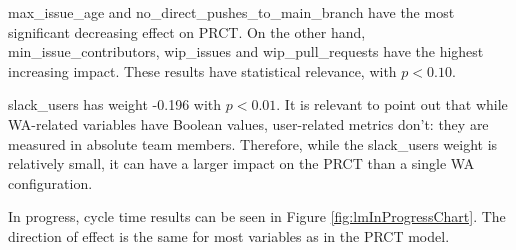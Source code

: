 max\_issue\_age and no\_direct\_pushes\_to\_main\_branch have the most significant decreasing effect on PRCT. On the other hand, min\_issue\_contributors, wip\_issues and wip\_pull\_requests have the highest increasing impact. These results have statistical relevance, with $ p < 0.10 $.

slack\_users has weight -0.196 with $ p < 0.01 $. It is relevant to point out that while WA-related variables have Boolean values, user-related metrics don't: they are measured in absolute team members. Therefore, while the slack\_users weight is relatively small, it can have a larger impact on the PRCT than a single WA configuration.





In progress, cycle time results can be seen in Figure \ref{fig:lmInProgressChart}. The direction of effect is the same for most variables as in the PRCT model. 


